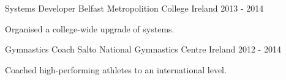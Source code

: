 \begin{cventries}
      \cventry
    {Systems Developer} %
    {Belfast Metropolition College} %
    {Ireland} %
    {2013 - 2014} %
        {  \begin{cvitems} %
        \item {Organised a college-wide upgrade of systems.}
      \end{cvitems}
      }

      \cventry
    {Gymnastics Coach} %
    {Salto National Gymnastics Centre} %
    {Ireland} %
    {2012 - 2014 } %
    {  \begin{cvitems} %
        \item {Coached high-performing athletes to an international level.}
      \end{cvitems}
      }


\end{cventries}
